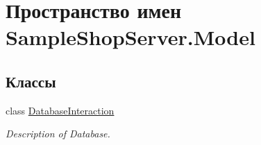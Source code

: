 \hypertarget{namespace_sample_shop_server_1_1_model}{}\section{Пространство имен Sample\+Shop\+Server.\+Model}
\label{namespace_sample_shop_server_1_1_model}
\subsection*{Классы}
\begin{DoxyCompactItemize}
\item 
class \hyperlink{class_sample_shop_server_1_1_model_1_1_database_interaction}{Database\+Interaction}
\begin{DoxyCompactList}\small\item\em Description of Database. \end{DoxyCompactList}\end{DoxyCompactItemize}
